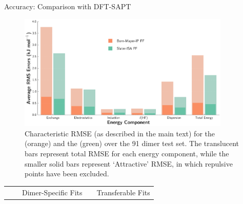 \begin{subsection}{Accuracy: Comparison with DFT-SAPT}
    \begin{figure}
    \includegraphics[width=0.9\textwidth]{isotropic/rmse_errors.pdf}
    \caption{
    Characteristic RMSE (as described in the main text) for the \saptff (orange) and the \isaffold (green) over the 91
    dimer test set. The translucent bars represent total RMSE
    for each energy component, while the smaller solid bars represent `Attractive'
    RMSE, in which repulsive points have been excluded.
            }
    \label{fig:isotropic-rmse}
    \end{figure}

\begin{landscape}
\begin{table}
\footnotesize
\centering
\renewcommand\arraystretch{1.1}
\begin{tabular}{@{}rcccccccc@{}}
\hline
\toprule
& \phantom{} &
  \multicolumn{3}{c}{Dimer-Specific Fits} &
  \phantom{ab} &
  \multicolumn{3}{c}{Transferable Fits} \\
\cmidrule{3-5} \cmidrule{7-9}


\end{tabular}
\end{table}
\end{landscape}
\end{subsection}
